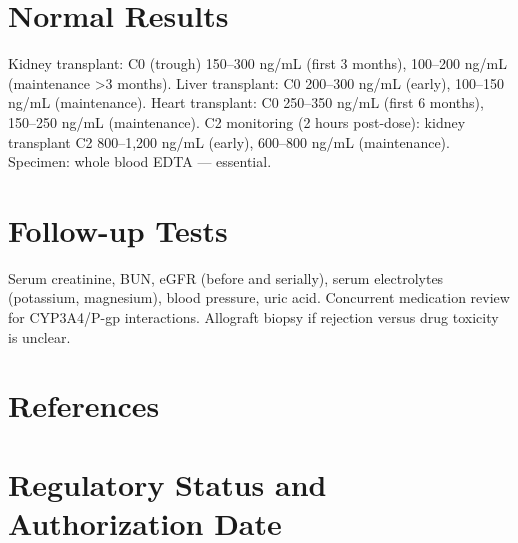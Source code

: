 \section*{Normal Results}
Kidney transplant: C0 (trough) 150--300 ng/mL (first 3 months), 100--200 ng/mL (maintenance >3 months). Liver transplant: C0 200--300 ng/mL (early), 100--150 ng/mL (maintenance). Heart transplant: C0 250--350 ng/mL (first 6 months), 150--250 ng/mL (maintenance). C2 monitoring (2 hours post-dose): kidney transplant C2 800--1,200 ng/mL (early), 600--800 ng/mL (maintenance). Specimen: whole blood EDTA --- essential.

\section*{Follow-up Tests}
Serum creatinine, BUN, eGFR (before and serially), serum electrolytes (potassium, magnesium), blood pressure, uric acid. Concurrent medication review for CYP3A4/P-gp interactions. Allograft biopsy if rejection versus drug toxicity is unclear.

\section*{References}



\clearpage
\section*{Regulatory Status and Authorization Date}

\clearpage
